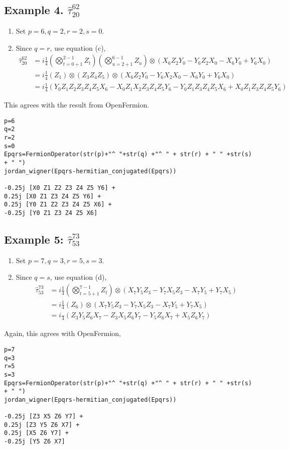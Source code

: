 \documentclass[prb,amsmath,amsfonts,amssymb]{revtex4}
\begin{document}
\subsection{Example 4. $\hat \tau_{20}^{62}$}
\begin{enumerate}
\item Set $p = 6, q = 2, r=2, s=0$. 
\item Since $q=r$, use equation (c),
\begin{align}
	\hat \tau_{20}^{62} &= i\frac{1}{4} \left(\bigotimes_{t=0+1}^{2-1}Z_t \right)  \left(\bigotimes_{u=2+1}^{6-1}Z_u \right) \otimes ( X_6 Z_2 Y_0 - Y_6 Z_2 X_0 - X_6 Y_0  +Y_6 X_0)\nonumber\\
	&=i \frac{1}{4} \left(Z_1\right) \otimes \left(Z_3Z_4Z_5\right)\otimes \left(X_6 Z_2 Y_0 - Y_6 X_2 X_0 - X_6 Y_0 + Y_6 X_0\right)\nonumber\\
	&= i \frac{1}{4} \left( Y_0 Z_1 Z_2 Z_3Z_4Z_5X_6 - X_0 Z_1 X_2 Z_3Z_4Z_5 Y_6 - Y_0Z_1 Z_3Z_4Z_5X_6 + X_0Z_1Z_3Z_4Z_5 Y_6\right)
\end{align}
\end{enumerate}
This agrees with the result from OpenFermion.
\begin{Verbatim}[frame=single, xleftmargin=4mm, xrightmargin=10mm]
p=6
q=2
r=2
s=0
Epqrs=FermionOperator(str(p)+"^ "+str(q) +"^ " + str(r) + " " +str(s) + " ") 
jordan_wigner(Epqrs-hermitian_conjugated(Epqrs))

-0.25j [X0 Z1 Z2 Z3 Z4 Z5 Y6] +
0.25j [X0 Z1 Z3 Z4 Z5 Y6] +
0.25j [Y0 Z1 Z2 Z3 Z4 Z5 X6] +
-0.25j [Y0 Z1 Z3 Z4 Z5 X6]
\end{Verbatim}

\newpage
\subsection{Example 5: $\hat \tau_{53}^{73}$}
\begin{enumerate}
\item Set $p = 7, q = 3, r=5, s=3$. 
\item Since $q=s$, use equation (d),
\begin{align}
	\hat \tau_{53}^{73} &= i\frac{1}{4} \left(\bigotimes_{t=5+1}^{7-1}Z_t \right)  \otimes \left(X_7 Y_5 Z_3 -Y_7 X_5 Z_3 -X_7 Y_5 +Y_7 X_5  \right) \nonumber\\
	&=i\frac{1}{4} \left(Z_6\right) \otimes \left(X_7 Y_5 Z_3 -Y_7 X_5 Z_3 -X_7 Y_5 +Y_7 X_5  \right) \nonumber\\
	&=i\frac{}{4}\left(Z_3 Y_5 Z_6 X_7 -Z_3 X_5 Z_6 Y_7 - Y_5 Z_6 X_7 + X_5  Z_6 Y_7  \right) 
	 \end{align}
\end{enumerate}
Again, this agrees with OpenFermion,
\begin{Verbatim}[frame=single, xleftmargin=4mm, xrightmargin=10mm]
p=7 
q=3 
r=5 
s=3 
Epqrs=FermionOperator(str(p)+"^ "+str(q) +"^ " + str(r) + " " +str(s) + " ") 
jordan_wigner(Epqrs-hermitian_conjugated(Epqrs))

-0.25j [Z3 X5 Z6 Y7] +
0.25j [Z3 Y5 Z6 X7] +
0.25j [X5 Z6 Y7] +
-0.25j [Y5 Z6 X7]
\end{Verbatim}
\end{document}
